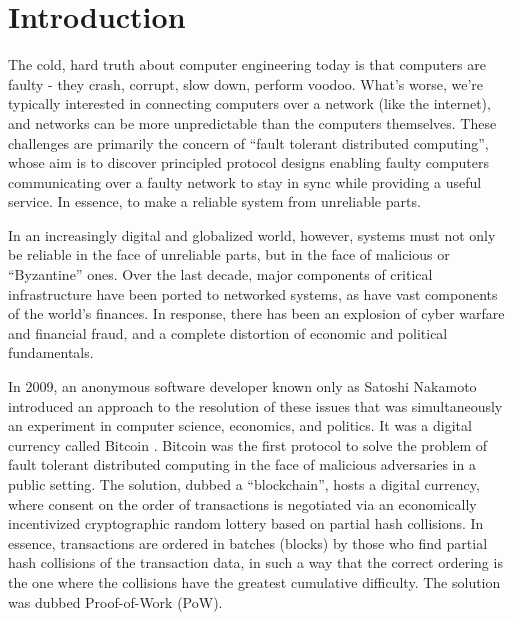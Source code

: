 \chapter{Introduction}
\label{ch:intro}

The cold, hard truth about computer engineering today is that computers are faulty - 
they crash, corrupt, slow down, perform voodoo. 
What's worse, we're typically interested in connecting computers over a network (like the internet),
and networks can be more unpredictable than the computers themselves.
These challenges are primarily the concern of ``fault tolerant distributed computing'',
whose aim is to discover principled protocol designs enabling faulty computers communicating over a faulty network 
to stay in sync while providing a useful service.
In essence, to make a reliable system from unreliable parts.

In an increasingly digital and globalized world, however, 
systems must not only be reliable in the face of unreliable parts, but in the face of malicious or ``Byzantine'' ones.
Over the last decade, major components of critical infrastructure have been ported to networked systems,
as have vast components of the world's finances.
In response, there has been an explosion of cyber warfare and financial fraud,
and a complete distortion of economic and political fundamentals.

In 2009, an anonymous software developer known only as Satoshi Nakamoto introduced an approach to the resolution of these issues 
that was simultaneously an experiment in computer science, economics, and politics. 
It was a digital currency called Bitcoin \cite{bitcoin}.
Bitcoin was the first protocol to solve the problem of fault tolerant distributed computing in the face of malicious adversaries in a public setting.
The solution, dubbed a ``blockchain'', hosts a digital currency, 
where consent on the order of transactions is negotiated via an economically incentivized cryptographic random lottery based on partial hash collisions.
In essence, transactions are ordered in batches (blocks) by those who find partial hash collisions of the transaction data, 
in such a way that the correct ordering is the one where the collisions have the greatest cumulative difficulty.
The solution was dubbed Proof-of-Work (PoW).

